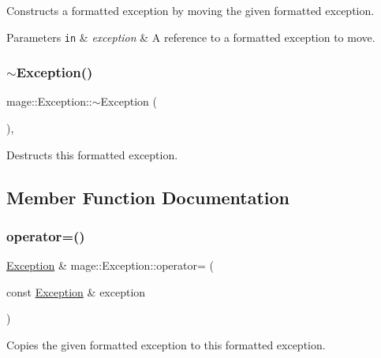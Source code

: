 Constructs a formatted exception by moving the given formatted exception.


\begin{DoxyParams}[1]{Parameters}
\mbox{\tt in}  & {\em exception} & A reference to a formatted exception to move. \\
\hline
\end{DoxyParams}
\hypertarget{classmage_1_1_exception_a088e91ba8dffd31a9d6aa7d4af2ee2c0}{}\label{classmage_1_1_exception_a088e91ba8dffd31a9d6aa7d4af2ee2c0} 
\subsubsection{\texorpdfstring{$\sim$\+Exception()}{~Exception()}}
{\footnotesize\ttfamily mage\+::\+Exception\+::$\sim$\+Exception (\begin{DoxyParamCaption}{ }\end{DoxyParamCaption})\hspace{0.3cm}{\ttfamily [virtual]}, {\ttfamily [default]}}

Destructs this formatted exception. 

\subsection{Member Function Documentation}
\hypertarget{classmage_1_1_exception_ab0e7e6b32b07505271a4a88067ab54f4}{}\label{classmage_1_1_exception_ab0e7e6b32b07505271a4a88067ab54f4} 
\subsubsection{\texorpdfstring{operator=()}{operator=()}\hspace{0.1cm}{\footnotesize\ttfamily [1/2]}}
{\footnotesize\ttfamily \hyperlink{classmage_1_1_exception}{Exception} \& mage\+::\+Exception\+::operator= (\begin{DoxyParamCaption}\item[{const \hyperlink{classmage_1_1_exception}{Exception} \&}]{exception }\end{DoxyParamCaption})\hspace{0.3cm}{\ttfamily [default]}}

Copies the given formatted exception to this formatted exception.


